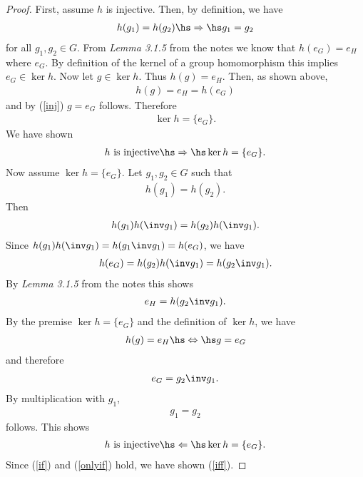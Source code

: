 \documentclass{article}
\begin{document}
\begin{proof}
    First, assume $h$ is injective. Then, by definition, we have
    \begin{align}
        \label{inj}
        h(g_1)=h(g_2) \hs\Rightarrow\hs g_1 = g_2
    \end{align}
    for all $g_1,g_2\in G$. From \emph{Lemma 3.1.5} from the notes
    we know that $h(e_G) = e_H$ where $e_G$. By definition of the kernel of
    a group homomorphism this implies $e_G\in\ker h$. Now let
    $g\in\ker h$. Thus $h(g) = e_H$. Then, as shown above,
    \begin{align*}
        h(g) = e_H = h(e_G)
    \end{align*}
    and by (\ref{inj}) $g=e_G$ follows. Therefore
    \begin{align*}
        \ker h = \{e_G\}.
    \end{align*}
    We have shown
    \begin{align}
        \label{if}
        h\text{ is injective}\hs\Rightarrow\hs \ker h = \{e_G\}.
    \end{align}
    Now assume $\ker h = \{e_G\}$. Let $g_1,g_2\in G$ such that
    \begin{align*}
        h(g_1) = h(g_2).
    \end{align*}
    Then
    \begin{align*}
        h(g_1)h(\inv g_1) = h(g_2)h(\inv g_1).
    \end{align*}
    Since $h(g_1)h(\inv g_1) = h(g_1\inv g_1) = h(e_G)$, we have
    \begin{align*}
        h(e_G) = h(g_2)h(\inv g_1)= h(g_2\inv g_1).
    \end{align*}
    By \emph{Lemma 3.1.5} from the notes this shows
    \begin{align*}
        e_H = h(g_2\inv g_1).
    \end{align*}
    By the premise $\ker h = \{e_G\}$ and the definition of $\ker h$,
    we have
    \begin{align*}
        h(g) = e_H \hs\Leftrightarrow\hs g=e_G
    \end{align*}
    and therefore
    \begin{align*}
        e_G = g_2\inv g_1.
    \end{align*}
    By multiplication with $g_1$,
    \begin{align*}
        g_1 = g_2
    \end{align*}
    follows. This shows
    \begin{align}
        \label{onlyif}
        h\text{ is injective}\hs\Leftarrow\hs \ker h = \{e_G\}.
    \end{align}
    Since (\ref{if}) and (\ref{onlyif}) hold, we have shown (\ref{iff}).
\end{proof}
\end{document}
